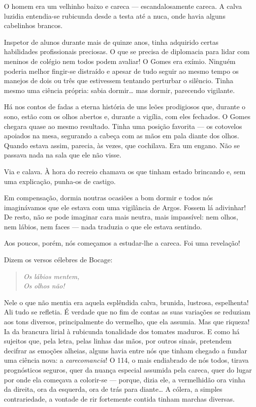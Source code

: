 O homem era um velhinho baixo e careca --- escandalosamente careca. A
calva luzidia entendia-se rubicunda desde a testa até a nuca, onde havia
alguns cabelinhos brancos.

Inspetor de alunos durante mais de quinze anos, tinha adquirido certas
habilidades profissionais preciosas. O que se precisa de diplomacia para
lidar com meninos de colégio nem todos podem avaliar! O Gomes era
exímio. Ninguém poderia melhor fingir-se distraído e apesar de tudo
seguir ao mesmo tempo os manejos de dois ou três que estivessem tentando
perturbar o silêncio. Tinha mesmo uma ciência própria: sabia dormir\ldots{}
mas dormir, parecendo vigilante.

Há nos contos de fadas a eterna história de uns leões prodigiosos que,
durante o sono, estão com os olhos abertos e, durante a vigília, com
eles fechados. O Gomes chegara quase ao mesmo resultado. Tinha uma
posição favorita --- os cotovelos apoiados na mesa, segurando a cabeça
com as mãos em pala diante dos olhos. Quando estava assim, parecia, às
vezes, que cochilava. Era um engano. Não se passava nada na sala que ele
não visse.

Via e calava. À hora do recreio chamava os que tinham estado brincando
e, sem uma explicação, punha-os de castigo.

Em compensação, dormia noutras ocasiões a bom dormir e todos nós
imaginávamos que ele estava com uma vigilância de Argos. Fossem lá
adivinhar! De resto, não se pode imaginar cara mais neutra, mais
impassível: nem olhos, nem lábios, nem faces --- nada traduzia o que ele
estava sentindo.

Aos poucos, porém, nós começamos a estudar-lhe a careca. Foi uma
revelação!

Dizem os versos célebres de Bocage:

\begin{verse}
\emph{Os lábios mentem,}\\
\emph{Os olhos não!}
\end{verse}

Nele o que não mentia era aquela esplêndida calva, brunida, lustrosa,
espelhenta! Ali tudo se refletia. É verdade que no fim de contas as suas
variações se reduziam aos tons diversos, principalmente do vermelho, que
ela assumia. Mas que riqueza! Ia da brancura lirial à rubicunda
tonalidade dos tomates maduros. E como há sujeitos que, pela letra,
pelas linhas das mãos, por outros sinais, pretendem decifrar as emoções
alheias, alguns havia entre nós que tinham chegado a fundar uma ciência
nova: a \emph{carecomancia}! O 114, o mais endiabrado de nós todos,
tirava prognósticos seguros, quer da nuança especial assumida pela
careca, quer do lugar por onde ela começava a colorir-se --- porque,
dizia ele, a vermelhidão ora vinha da direita, ora da esquerda, ora de
trás para diante\ldots{} A cólera, a simples contrariedade, a vontade de rir
fortemente contida tinham marchas diversas.

